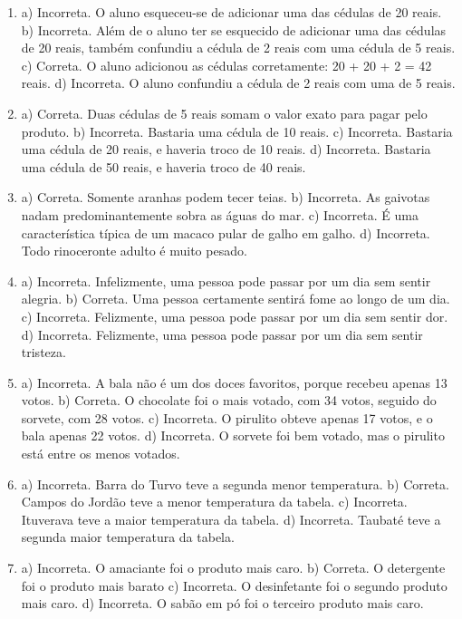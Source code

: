 \begin{enumerate}
\item
a) Incorreta. O aluno esqueceu-se de adicionar uma das cédulas de 20
reais.
b) Incorreta. Além de o aluno ter se esquecido de adicionar uma das
cédulas de 20 reais, também confundiu a cédula de 2 reais com
uma cédula de 5 reais.
c) Correta. O aluno adicionou as cédulas corretamente: 20 + 20 + 2 = 42
reais.
d) Incorreta. O aluno confundiu a cédula de 2 reais com uma de 5
reais.

\item
a) Correta. Duas cédulas de 5 reais somam o valor exato para pagar pelo produto.
b) Incorreta. Bastaria uma cédula de 10 reais.
c) Incorreta. Bastaria uma cédula de 20 reais, e haveria troco de 10 reais.
d) Incorreta. Bastaria uma cédula de 50 reais, e haveria troco de 40 reais.

\item
a) Correta. Somente aranhas podem tecer teias.
b) Incorreta. As gaivotas nadam predominantemente sobra as águas do mar.
c) Incorreta. É uma característica típica de um macaco pular de galho em
galho.
d) Incorreta. Todo rinoceronte adulto é muito pesado.

\item
a) Incorreta. Infelizmente, uma pessoa pode passar por um dia sem sentir alegria.
b) Correta. Uma pessoa certamente sentirá fome ao longo de um dia.
c) Incorreta. Felizmente, uma pessoa pode passar por um dia sem sentir dor.
d) Incorreta. Felizmente, uma pessoa pode passar por um dia sem sentir tristeza.

\item
a) Incorreta. A bala não é um dos doces favoritos, porque recebeu apenas 13 votos.
b) Correta. O chocolate foi o mais votado, com 34 votos, seguido do sorvete, com 28 votos.
c) Incorreta. O pirulito obteve apenas 17 votos, e o bala apenas 22 votos.
d) Incorreta. O sorvete foi bem votado, mas o pirulito está entre os menos votados.

\item
a) Incorreta. Barra do Turvo teve a segunda menor temperatura.
b) Correta. Campos do Jordão teve a menor temperatura da tabela.
c) Incorreta. Ituverava teve a maior temperatura da tabela.
d) Incorreta. Taubaté teve a segunda maior temperatura da tabela.

\item
a) Incorreta. O amaciante foi o produto mais caro.
b) Correta. O detergente foi o produto mais barato
c) Incorreta. O desinfetante foi o segundo produto mais caro.
d) Incorreta. O sabão em pó foi o terceiro produto mais caro.
\end{enumerate}

